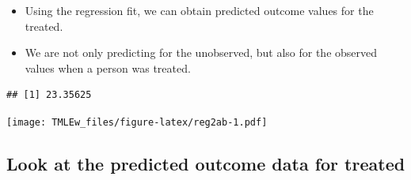 \documentclass[
]{book}
\newenvironment{Shaded}{\begin{snugshade}}{\end{snugshade}}
\newcommand{\AttributeTok}[1]{\textcolor[rgb]{0.77,0.63,0.00}{#1}}
\newcommand{\DecValTok}[1]{\textcolor[rgb]{0.00,0.00,0.81}{#1}}
\newcommand{\FunctionTok}[1]{\textcolor[rgb]{0.00,0.00,0.00}{#1}}
\newcommand{\NormalTok}[1]{#1}
\newcommand{\OtherTok}[1]{\textcolor[rgb]{0.56,0.35,0.01}{#1}}
\newcommand{\SpecialCharTok}[1]{\textcolor[rgb]{0.00,0.00,0.00}{#1}}
\newcommand{\StringTok}[1]{\textcolor[rgb]{0.31,0.60,0.02}{#1}}
\providecommand{\tightlist}{%
  \setlength{\itemsep}{0pt}\setlength{\parskip}{0pt}}
\begin{document}
\begin{itemize}
\tightlist
\item
  Using the regression fit, we can obtain predicted outcome values for the treated.
\item
  We are not only predicting for the unobserved, but also for the observed values when a person was treated.
\end{itemize}

\begin{Shaded}
\end{Shaded}

\begin{verbatim}
## [1] 23.35625
\end{verbatim}

\begin{Shaded}
\end{Shaded}

\texttt{[image: TMLEw\_files/figure-latex/reg2ab-1.pdf]}

\hypertarget{look-at-the-predicted-outcome-data-for-treated}{%
\subsection{Look at the predicted outcome data for treated}\label{look-at-the-predicted-outcome-data-for-treated}}
\end{document}
